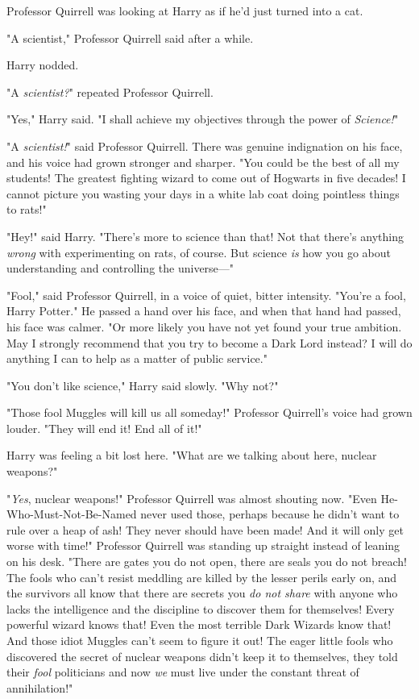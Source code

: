 Professor Quirrell was looking at Harry as if he'd just turned into a cat.

"A scientist," Professor Quirrell said after a while.

Harry nodded.

"A \emph{scientist?}" repeated Professor Quirrell.

"Yes," Harry said. "I shall achieve my objectives through the power{\el} of
\emph{Science!}"

"A \emph{scientist!}" said Professor Quirrell. There was genuine indignation on
his face, and his voice had grown stronger and sharper. "You could be the best
of all my students! The greatest fighting wizard to come out of Hogwarts in
five decades! I cannot picture you wasting your days in a white lab coat doing
pointless things to rats!"

"Hey!" said Harry. "There's more to science than that! Not that there's
anything \emph{wrong} with experimenting on rats, of course. But science
\emph{is} how you go about understanding and controlling the universe\mbox{---}"

"Fool," said Professor Quirrell, in a voice of quiet, bitter intensity. "You're
a fool, Harry Potter." He passed a hand over his face, and when that hand had
passed, his face was calmer. "Or more likely you have not yet found your true
ambition. May I strongly recommend that you try to become a Dark Lord instead?
I will do anything I can to help as a matter of public service."

"You don't like science," Harry said slowly. "Why not?"

"Those fool Muggles will kill us all someday!" Professor Quirrell's voice had
grown louder. "They will end it! End all of it!"

Harry was feeling a bit lost here. "What are we talking about here, nuclear
weapons?"

"\emph{Yes}, nuclear weapons!" Professor Quirrell was almost shouting now.
"Even He-Who-Must-Not-Be-Named never used those, perhaps because he didn't want
to rule over a heap of ash! They never should have been made! And it will only
get worse with time!" Professor Quirrell was standing up straight instead of
leaning on his desk. "There are gates you do not open, there are seals you do
not breach! The fools who can't resist meddling are killed by the lesser perils
early on, and the survivors all know that there are secrets you \emph{do not
share} with anyone who lacks the intelligence and the discipline to discover
them for themselves! Every powerful wizard knows that! Even the most terrible
Dark Wizards know that! And those idiot Muggles can't seem to figure it out!
The eager little fools who discovered the secret of nuclear weapons didn't keep
it to themselves, they told their \emph{fool} politicians and now \emph{we}
must live under the constant threat of annihilation!"


